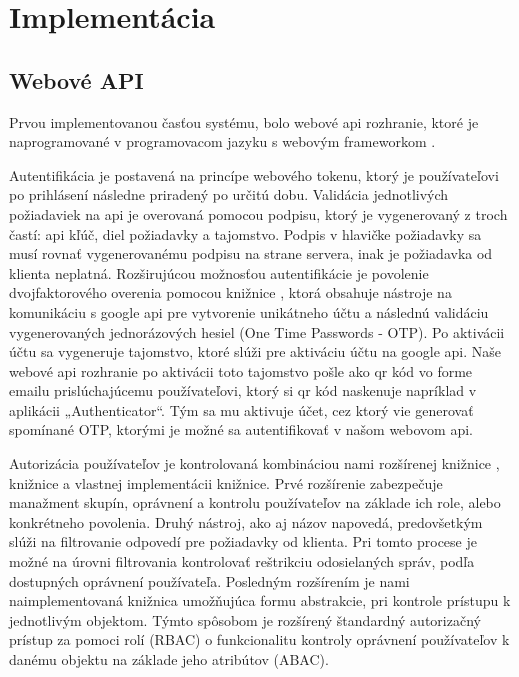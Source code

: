 \chapter{Implementácia}\label{ch:implementácia}

\section{Webové API}\label{sec:webove-api}

Prvou implementovanou časťou systému, bolo webové api rozhranie, ktoré je naprogramované v programovacom jazyku 
s webovým frameworkom .

Autentifikácia je postavená na princípe webového tokenu, ktorý je používateľovi po prihlásení následne priradený po určitú dobu.
Validácia jednotlivých požiadaviek na api je overovaná pomocou podpisu, ktorý je vygenerovaný z troch častí: api kľúč, diel
požiadavky a tajomstvo.
Podpis v hlavičke požiadavky sa musí rovnať vygenerovanému podpisu na strane servera, inak je požiadavka od klienta neplatná.
Rozširujúcou možnosťou autentifikácie je povolenie dvojfaktorového overenia pomocou knižnice , ktorá obsahuje
nástroje na komunikáciu s google api pre vytvorenie unikátneho účtu a následnú validáciu vygenerovaných jednorázových hesiel
(One Time Passwords - OTP).
Po aktivácii účtu sa vygeneruje tajomstvo, ktoré slúži pre aktiváciu účtu na google api.
Naše webové api rozhranie po aktivácii toto tajomstvo pošle ako qr kód vo forme emailu prislúchajúcemu používateľovi, ktorý si
qr kód naskenuje napríklad v aplikácii „Authenticator“.
Tým sa mu aktivuje účet, cez ktorý vie generovať spomínané OTP, ktorými je možné sa autentifikovať v našom webovom api.

Autorizácia používateľov je kontrolovaná kombináciou nami rozšírenej knižnice , knižnice
 a vlastnej implementácii knižnice\newline{}.
Prvé rozšírenie zabezpečuje manažment skupín, oprávnení a kontrolu používateľov na základe ich role, alebo konkrétneho povolenia.
Druhý nástroj, ako aj názov napovedá, predovšetkým slúži na filtrovanie odpovedí pre požiadavky od klienta.
Pri tomto procese je možné na úrovni filtrovania kontrolovať reštrikciu odosielaných správ, podľa dostupných oprávnení používateľa.
Posledným rozšírením je nami naimplementovaná knižnica umožňujúca formu abstrakcie, pri kontrole prístupu k jednotlivým objektom.
Týmto spôsobom je rozšírený štandardný autorizačný prístup za pomoci rolí (RBAC) o funkcionalitu kontroly oprávnení používateľov k
danému objektu na základe jeho atribútov (ABAC).

